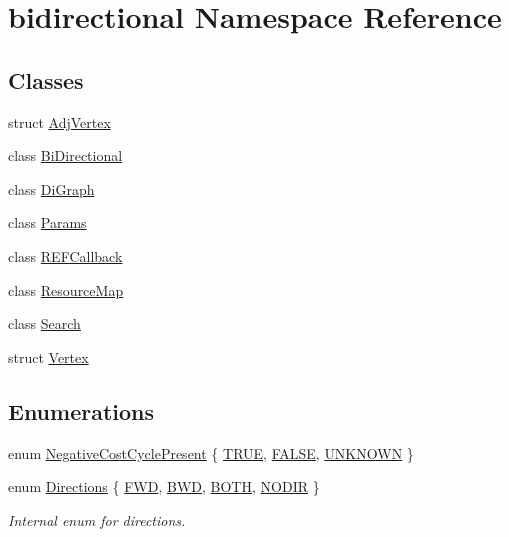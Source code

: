 \hypertarget{namespacebidirectional}{}\section{bidirectional Namespace Reference}
\label{namespacebidirectional}
\subsection*{Classes}
\begin{DoxyCompactItemize}
\item 
struct \hyperlink{structbidirectional_1_1AdjVertex}{Adj\+Vertex}
\item 
class \hyperlink{classbidirectional_1_1BiDirectional}{Bi\+Directional}
\item 
class \hyperlink{classbidirectional_1_1DiGraph}{Di\+Graph}
\item 
class \hyperlink{classbidirectional_1_1Params}{Params}
\item 
class \hyperlink{classbidirectional_1_1REFCallback}{R\+E\+F\+Callback}
\item 
class \hyperlink{classbidirectional_1_1ResourceMap}{Resource\+Map}
\item 
class \hyperlink{classbidirectional_1_1Search}{Search}
\item 
struct \hyperlink{structbidirectional_1_1Vertex}{Vertex}
\end{DoxyCompactItemize}
\subsection*{Enumerations}
\begin{DoxyCompactItemize}
\item 
enum \hyperlink{namespacebidirectional_a507ec433f8ac22a92fcc3b8aad252f29}{Negative\+Cost\+Cycle\+Present} \{ \hyperlink{namespacebidirectional_a507ec433f8ac22a92fcc3b8aad252f29a50727807c27ff7820eef09fbe631eba9}{T\+R\+UE}, 
\hyperlink{namespacebidirectional_a507ec433f8ac22a92fcc3b8aad252f29a7fcb4521ab8f836164a0670be9848d18}{F\+A\+L\+SE}, 
\hyperlink{namespacebidirectional_a507ec433f8ac22a92fcc3b8aad252f29aa5cae7e7a4dd360b53f1c5532ed64f59}{U\+N\+K\+N\+O\+WN}
 \}
\item 
enum \hyperlink{namespacebidirectional_a4cbe6f0bfbd3629c2cd44c98014aed70}{Directions} \{ \hyperlink{namespacebidirectional_a4cbe6f0bfbd3629c2cd44c98014aed70a798987f7644a83982bae650870e1ccc0}{F\+WD}, 
\hyperlink{namespacebidirectional_a4cbe6f0bfbd3629c2cd44c98014aed70a3e91263cd11d5fd4ceaec8830938740f}{B\+WD}, 
\hyperlink{namespacebidirectional_a4cbe6f0bfbd3629c2cd44c98014aed70ab50b3fbd895a667b43b3e9eb3bd54f85}{B\+O\+TH}, 
\hyperlink{namespacebidirectional_a4cbe6f0bfbd3629c2cd44c98014aed70a37837b18a2ed90dd3c428984af217f47}{N\+O\+D\+IR}
 \}\begin{DoxyCompactList}\small\item\em Internal enum for directions. \end{DoxyCompactList}
\end{DoxyCompactItemize}
